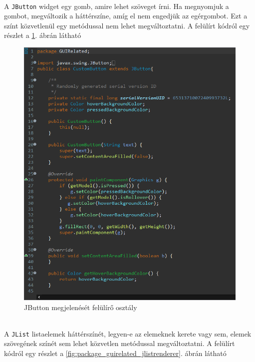 \vspace{5pt}\\A \texttt{JButton} widget egy gomb, amire lehet szöveget írni. Ha megnyomjuk a gombot, megváltozik a háttérszíne, amíg el nem engedjük az egérgombot. Ezt a színt közvetlenül egy metódussal nem lehet megváltoztatni. A felülírt kódról egy részlet a \ref{fig:package_guirelated_jbutton}. ábrán látható
\begin{figure}[h]
	\centering
	\includegraphics[scale=0.3]{images/package_guirelated_jbutton_details.png}
	\caption{JButton megjelenését felülírő osztály}
	\label{fig:package_guirelated_jbutton}
\end{figure}
\\A \texttt{JList} listaelemek háttérszínét, legyen-e az elemeknek kerete vagy sem, elemek szövegének színét sem lehet közvetlen metódussal megváltoztatni. A felülírt kódról egy részlet a \ref{fig:package_guirelated_jlistrenderer}. ábrán látható
